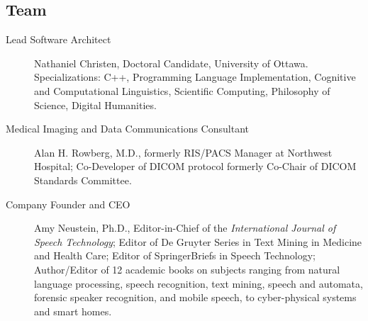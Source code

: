 
\begin{frame}{}
\section{Team}


\begin{center}
\begin{minipage}{0.84\textwidth}
{\LARGE \setlength{\leftmargini}{3pt}\begin{description}
\item[Lead Software Architect]  {\lsep} Nathaniel Christen, Doctoral Candidate, University of Ottawa.  
Specializations: C++, Programming Language 
Implementation, Cognitive and Computational 
Linguistics, Scientific Computing, Philosophy 
of Science, Digital Humanities.{\thrule}
\item[Medical Imaging and Data Communications Consultant]  {\lsep} Alan H. Rowberg, M.D., formerly
RIS/PACS Manager at Northwest Hospital; Co-Developer of DICOM protocol formerly Co-Chair
of DICOM Standards Committee.{\thrule}
\item[Company Founder and CEO]  {\lsep} Amy Neustein, Ph.D., Editor-in-Chief of the \textit{International Journal of
Speech Technology}; Editor of De Gruyter Series in Text Mining in Medicine and Health Care;
Editor of SpringerBriefs in Speech Technology; Author/Editor of 12 academic books on subjects
ranging from natural language processing, speech recognition, 
text mining, speech and
automata, forensic speaker recognition, 
and mobile speech, to cyber-physical systems 
and smart homes.\vspace{1em}  
\end{description}}
\end{minipage}
\end{center}


\end{frame}

